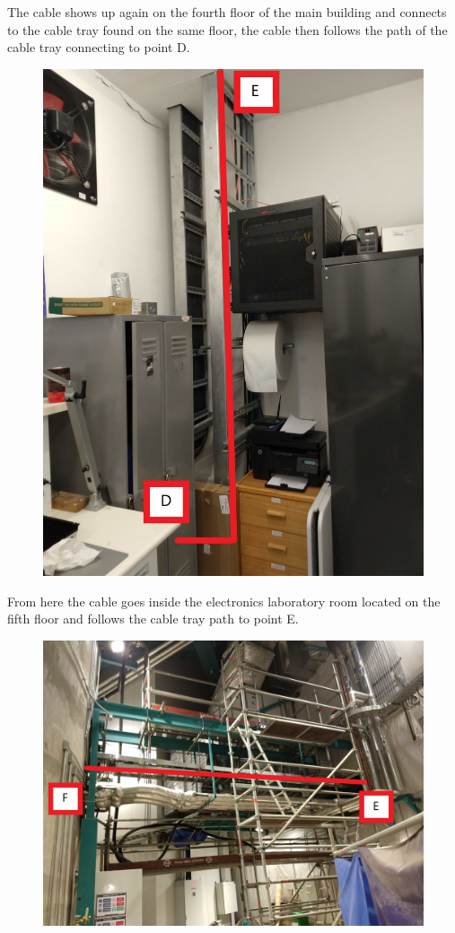 The cable shows up again on the fourth floor of the main building and connects to the cable tray found on the same floor, the cable then follows the path of the cable tray connecting to point D.

\begin{figure}
  \includegraphics[width=\textwidth]{images/17.jpg}
  \label{fig:jlsimon}
\end{figure}

From here the cable goes inside the electronics laboratory room located on the fifth floor and follows the cable tray path to point E.

\begin{figure}
  \includegraphics[width=\textwidth]{images/18.jpg}
  \label{fig:jlsimon}
\end{figure}

